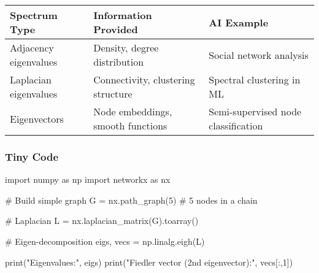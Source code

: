 \documentclass[
  letterpaper,
  DIV=11,
  numbers=noendperiod]{scrreprt}
\newenvironment{Shaded}{\begin{snugshade}}{\end{snugshade}}
\newcommand{\BuiltInTok}[1]{\textcolor[rgb]{0.00,0.23,0.31}{#1}}
\newcommand{\CommentTok}[1]{\textcolor[rgb]{0.37,0.37,0.37}{#1}}
\newcommand{\DecValTok}[1]{\textcolor[rgb]{0.68,0.00,0.00}{#1}}
\newcommand{\ImportTok}[1]{\textcolor[rgb]{0.00,0.46,0.62}{#1}}
\newcommand{\NormalTok}[1]{\textcolor[rgb]{0.00,0.23,0.31}{#1}}
\newcommand{\OperatorTok}[1]{\textcolor[rgb]{0.37,0.37,0.37}{#1}}
\newcommand{\StringTok}[1]{\textcolor[rgb]{0.13,0.47,0.30}{#1}}
\begin{document}
\begin{longtable}[]{@{}
  >{\raggedright\arraybackslash}p{}
  >{\raggedright\arraybackslash}p{}
  >{\raggedright\arraybackslash}p{}@{}}
\toprule\noalign{}
\begin{minipage}[b]{\linewidth}\raggedright
Spectrum Type
\end{minipage} & \begin{minipage}[b]{\linewidth}\raggedright
Information Provided
\end{minipage} & \begin{minipage}[b]{\linewidth}\raggedright
AI Example
\end{minipage} \\
\midrule\noalign{}
\endhead
\bottomrule\noalign{}
\endlastfoot
Adjacency eigenvalues & Density, degree distribution & Social network
analysis \\
Laplacian eigenvalues & Connectivity, clustering structure & Spectral
clustering in ML \\
Eigenvectors & Node embeddings, smooth functions & Semi-supervised node
classification \\
\end{longtable}

\subsubsection{Tiny Code}\label{tiny-code-165}

\begin{Shaded}
\begin{Highlighting}[]
\ImportTok{import}\NormalTok{ numpy }\ImportTok{as}\NormalTok{ np}
\ImportTok{import}\NormalTok{ networkx }\ImportTok{as}\NormalTok{ nx}

\CommentTok{\# Build simple graph}
\NormalTok{G }\OperatorTok{=}\NormalTok{ nx.path\_graph(}\DecValTok{5}\NormalTok{)  }\CommentTok{\# 5 nodes in a chain}

\CommentTok{\# Laplacian}
\NormalTok{L }\OperatorTok{=}\NormalTok{ nx.laplacian\_matrix(G).toarray()}

\CommentTok{\# Eigen{-}decomposition}
\NormalTok{eigs, vecs }\OperatorTok{=}\NormalTok{ np.linalg.eigh(L)}

\BuiltInTok{print}\NormalTok{(}\StringTok{"Eigenvalues:"}\NormalTok{, eigs)}
\BuiltInTok{print}\NormalTok{(}\StringTok{"Fiedler vector (2nd eigenvector):"}\NormalTok{, vecs[:,}\DecValTok{1}\NormalTok{])}
\end{Highlighting}
\end{Shaded}
\end{document}
